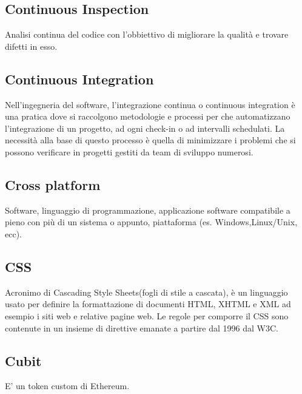\subsection{Continuous Inspection}
Analisi continua del codice con l'obbiettivo di migliorare la qualità e trovare difetti in esso. 

\subsection{Continuous Integration}
Nell'ingegneria del software, l'integrazione continua o continuous integration è una pratica dove si raccolgono metodologie e processi per che automatizzano l’integrazione di un progetto, ad ogni check-in o ad intervalli schedulati. La necessità alla base di questo processo è quella di minimizzare i problemi che si possono verificare in progetti gestiti da team di sviluppo numerosi.

\subsection{Cross platform}
Software, linguaggio di programmazione, applicazione software compatibile a pieno con più di un sistema o appunto, piattaforma (es. Windows,Linux/Unix, ecc).    

\subsection{CSS}
Acronimo di Cascading Style Sheets(fogli di stile a cascata), è un linguaggio usato per definire la formattazione di documenti HTML, XHTML e XML ad esempio i siti web e relative pagine web. Le regole per comporre il CSS sono contenute in un insieme di direttive emanate a partire dal 1996 dal W3C.

\subsection{Cubit}
E' un token custom di Ethereum.



